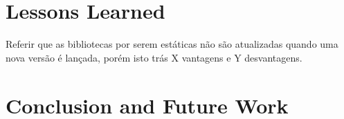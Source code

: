\documentclass[a4paper,fleqn]{cas-dc}
\begin{document}
\section{Lessons Learned}

Referir que as bibliotecas por serem estáticas não são atualizadas quando uma nova versão é lançada, porém isto trás X vantagens e Y desvantagens.

\section{Conclusion and Future Work}
\label{conclusion}
\printcredits

%
%



\end{document}
